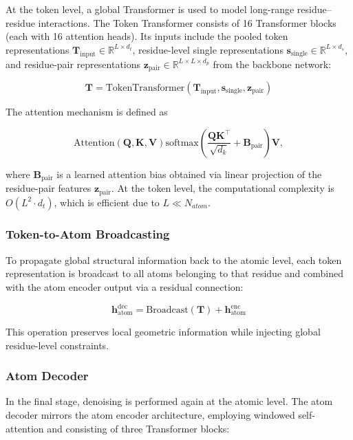 At the token level, a global Transformer is used to model long-range residue–residue interactions. The Token Transformer consists of 16 Transformer blocks (each with 16 attention heads). Its inputs include the pooled token representations $\mathbf{T}_{\text{input}} \in \mathbb{R}^{L \times d_t}$, residue-level single representations $\mathbf{s}_{\text{single}} \in \mathbb{R}^{L \times d_s}$, and residue-pair representations $\mathbf{z}_{\text{pair}} \in \mathbb{R}^{L \times L \times d_p}$ from the backbone network:

$$  
\mathbf{T} =  
\mathrm{TokenTransformer}\left(  
\mathbf{T}_{\text{input}}, \mathbf{s}_{\text{single}}, \mathbf{z}_{\text{pair}}  
\right)  
$$

The attention mechanism is defined as

$$  
\mathrm{Attention}(\mathbf{Q}, \mathbf{K}, \mathbf{V})
\mathrm{softmax}\left(  
\frac{\mathbf{Q}\mathbf{K}^\top}{\sqrt{d_k}} + \mathbf{B}_{\text{pair}}  
\right)\mathbf{V},  
$$

where $\mathbf{B}_{\text{pair}}$ is a learned attention bias obtained via linear projection of the residue-pair features $\mathbf{z}_{\text{pair}}$. At the token level, the computational complexity is $O(L^2 \cdot d_t)$, which is efficient due to $L \ll N_{atom}$.


\subsubsection{Token-to-Atom Broadcasting}


To propagate global structural information back to the atomic level, each token representation is broadcast to all atoms belonging to that residue and combined with the atom encoder output via a residual connection:

$$  
\mathbf{h}_{\text{atom}}^{\text{dec}} =  
\mathrm{Broadcast}(\mathbf{T}) + \mathbf{h}_{\text{atom}}^{\text{enc}}  
$$

This operation preserves local geometric information while injecting global residue-level constraints.


\subsubsection{Atom Decoder}

In the final stage, denoising is performed again at the atomic level. The atom decoder mirrors the atom encoder architecture, employing windowed self-attention and consisting of three Transformer blocks:

